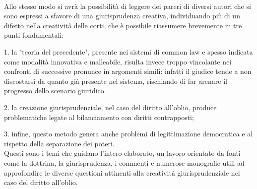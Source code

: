\\Allo stesso modo si avrà la possibilità di leggere dei pareri di diversi autori che si sono espressi a sfavore di una giurisprudenza creativa, individuando più di un difetto nella creatività delle corti, che è possibile riassumere brevemente in tre punti fondamentali: 

1. la "teoria del precedente", presente nei sistemi di common law e spesso indicata come modalità innovativa e malleabile, risulta invece troppo vincolante nei confronti di successive pronunce in argomenti simili: infatti il giudice tende a non discostarsi da quanto già presente nel sistema, rischiando di far arenare il progresso dello scenario giuridico.

2. la creazione giurisprudenziale, nel caso del diritto all’oblio, produce problematiche legate al bilanciamento con diritti contrapposti;

3. infine, questo metodo genera anche problemi di legittimazione democratica e al rispetto della separazione dei poteri.
\\Questi sono i temi che guidano l'intero elaborato, un lavoro orientato da fonti come la dottrina, la giurisprudenza, %
i commenti e numerose monografie utili ad approfondire le diverse questioni attinenti alla creatività giurisprudenziale nel caso del diritto all'oblio.

